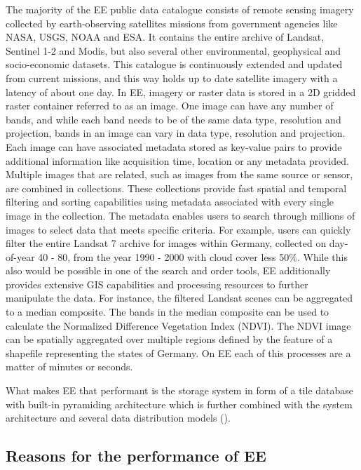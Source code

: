 The majority of the EE public data catalogue consists of remote sensing imagery collected by earth-observing satellites missions from government agencies like NASA, USGS, NOAA and ESA. It contains the entire archive of Landsat, Sentinel 1-2 and Modis, but also several other environmental, geophysical and socio-economic datasets. This catalogue is continuously extended and updated from current missions, and this way holds up to date satellite imagery with a latency of about one day.
In EE, imagery or raster data is stored in a 2D gridded raster container referred to as an image. One image can have any number of bands, and while each band needs to be of the same data type, resolution and projection, bands in an image can vary in data type, resolution and projection. Each image can have associated metadata stored as key-value pairs to provide additional information like acquisition time, location or any metadata provided.
Multiple images that are related, such as images from the same source or sensor, are combined in collections. These collections provide fast spatial and temporal filtering and sorting capabilities using metadata associated with every single image in the collection. The metadata enables users to search through millions of images to select data that meets specific criteria. For example, users can quickly filter the entire Landsat 7 archive for images within Germany, collected on day-of-year 40 - 80, from the year 1990 - 2000 with cloud cover less 50\%. While this also would be possible in one of the search and order tools, EE additionally provides extensive GIS capabilities and processing resources to further manipulate the data.
For instance, the filtered Landsat scenes can be aggregated to a median composite. The bands in the median composite can be used to calculate the Normalized Difference Vegetation Index (NDVI). The NDVI image can be spatially aggregated over multiple regions defined by the feature of a shapefile representing the states of Germany. On EE each of this processes are a matter of minutes or seconds.

What makes EE that performant is the storage system in form of a tile database with built-in pyramiding architecture which is further combined with the system architecture and several data distribution models (\cite{gorelick2017google}).

\subsection{Reasons for the performance of EE}

